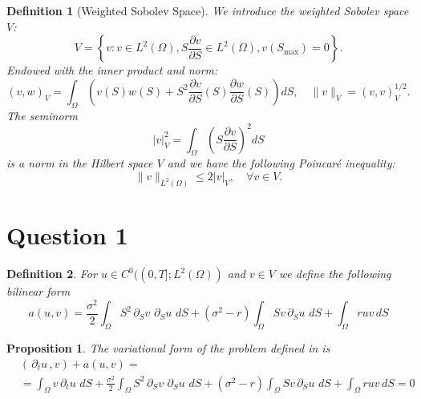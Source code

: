 \documentclass{article}
\newtheorem{df}{Definition}[section]
\newtheorem{prop}[thm]{Proposition}
\newcommand{\intS}[1]{\ensuremath{\int_{\Omega}#1 \, dS}}
\newcommand{\darg}[2]{\ensuremath{\, \partial_{#2}#1} \, }
\newcommand{\dt}[1]{\ensuremath{\darg{#1}{t}}}
\newcommand{\dS}[1]{\ensuremath{\darg{#1}{S}}}
\newcommand{\dtu}{\dt{u}}
\newcommand{\sigmafrac}{\ensuremath{\frac{\sigma^2}{2}}}
\newcommand{\czero}{\ensuremath{C^0((0,T];L^2(\Omega))}}
\newcommand{\aform}[2]{\ensuremath{\sigmafrac \intS{S^2 \dS{#2} \dS{#1}} + (\sigma^2 - r) \intS{S #2 \dS{#1}} + \intS{r  #1  #2}}}
\newcommand{\auv}{\aform{u}{v}}
\begin{document}
\begin{df}[Weighted Sobolev Space]
We introduce the weighted Sobolev space \( V \):
\[
V = \left\{ v : v \in L^2(\Omega), S \frac{\partial v}{\partial S} \in L^2(\Omega), v(S_{\max}) = 0 \right\}.
\]
Endowed with the inner product and norm:
\[
(v, w)_V = \int_\Omega \left( v(S) w(S) + S^2 \frac{\partial v}{\partial S}(S) \frac{\partial w}{\partial S}(S) \right) dS, \quad \| v \|_V = (v, v)_V^{1/2}.
\]
The seminorm
\[
|v|_V^2 = \int_\Omega \left( S \frac{\partial v}{\partial S} \right)^2 dS
\]
is a norm in the Hilbert space \( V \) and we have the following Poincaré inequality:
\[
\| v \|_{L^2(\Omega)} \leq 2 |v|_V, \quad \forall v \in V.
\]
\end{df}

\section{Question 1}
\begin{df}\label{def:a}
    For $u \in \czero$ and $v \in V$ we define the following bilinear form
    \begin{equation*}
        a(u,v) = \auv
    \end{equation*}
\end{df}
\begin{prop}\label{prop:variational_form}
    The variational form of the problem defined in  is
    \begin{align*}
    &\left( \dtu, v\right) + a(u,v) = \\
    &= \intS{v \dtu} + \auv = 0
    \end{align*}
\end{prop}
\end{document}

